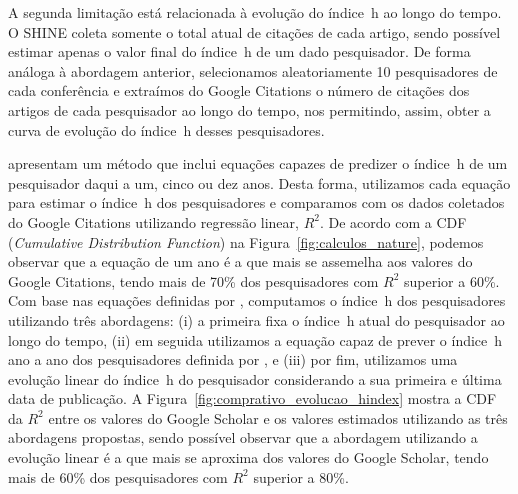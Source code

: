 A segunda limitação está relacionada à evolução do índice~h ao longo do tempo. O 
SHINE coleta somente o total atual de citações de cada artigo, sendo possível estimar 
apenas o valor final do índice~h de um dado pesquisador. De forma análoga à abordagem 
anterior, selecionamos aleatoriamente 10 pesquisadores de cada conferência e extraímos 
do Google Citations o número de citações dos artigos de cada pesquisador ao longo 
do tempo, nos permitindo, assim, obter a curva de evolução do índice~h desses pesquisadores.

\cite{Acuna2012} apresentam um método que inclui equações capazes de predizer o índice~h 
de um pesquisador daqui a um, cinco ou dez anos. Desta forma, 
utilizamos cada equação para estimar o índice~h dos pesquisadores e comparamos com os 
dados coletados do Google Citations utilizando regressão linear, $R^2$. De acordo com 
a CDF (\textit{Cumulative Distribution Function}) na Figura~\ref{fig:calculos_nature}, 
podemos observar que a equação de um ano é a que mais se assemelha aos valores do Google
Citations, tendo mais de 70\% dos pesquisadores com $R^2$ superior a 60\%. Com base 
nas equações definidas por \cite{Acuna2012}, computamos o índice~h dos pesquisadores
utilizando três abordagens: (i) a primeira fixa o índice~h atual do pesquisador ao 
longo do tempo, (ii) em seguida utilizamos a equação capaz de prever o índice~h ano a ano 
dos pesquisadores definida por \cite{Acuna2012}, e (iii) por fim, utilizamos uma 
evolução linear do índice~h do pesquisador considerando a sua primeira e última data de publicação.
A Figura~\ref{fig:comprativo_evolucao_hindex} mostra a CDF da $R^2$ entre os valores 
do Google Scholar e os valores estimados utilizando as três abordagens propostas, sendo 
possível observar que a abordagem utilizando a evolução linear é a que mais se 
aproxima dos valores do Google Scholar, tendo mais de 60\% dos pesquisadores com $R^2$ superior a 80\%.


